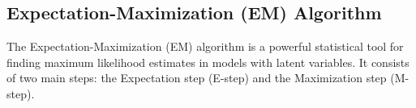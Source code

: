 \documentclass{article}
\begin{document}
  


\subsection{Expectation-Maximization (EM) Algorithm}







The Expectation-Maximization (EM) algorithm is a powerful statistical tool for finding maximum likelihood estimates in models with latent variables. It consists of two main steps: the Expectation step (E-step) and the Maximization step (M-step).
\end{document}
